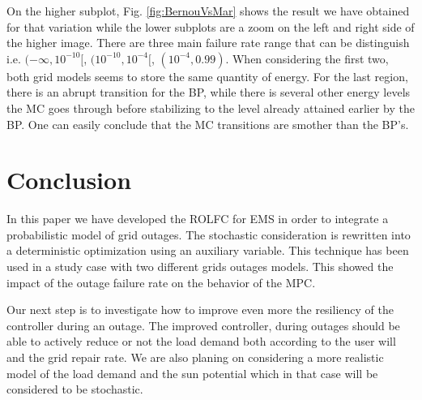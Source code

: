 \documentclass[conference]{IEEEtran}
\begin{document}
 On the higher subplot, Fig. \ref{fig:BernouVsMar} shows the result we have obtained for that variation while the lower subplots are a zoom on the left and right side of the higher image. There are three main failure rate range that can be distinguish i.e. $(-\infty,10^{-10}[$, $(10^{-10},10^{-4}[$, $(10^{-4},0.99)$. When considering the first two, both grid models seems to store the same quantity of energy. For the last region, there is an abrupt transition for the BP, while there is several other energy levels the MC goes through before stabilizing to the level already attained earlier by the BP. One can easily conclude that the MC transitions are smother than the BP's. 
 
 
\section{Conclusion}\label{conclusion}
In this paper we have developed the ROLFC for EMS in order to integrate a probabilistic model of grid outages. The stochastic consideration is rewritten into a deterministic optimization using an auxiliary variable. This technique has been used in a study case with two different grids outages models. This showed the impact of the outage  failure rate on the behavior of the MPC.

 Our next step is to investigate how to improve even more the resiliency of the controller during an outage. The improved controller, during outages should be able to actively reduce or not the load demand both according to the user will and the grid repair rate. We are also planing on considering a more realistic model of the load demand and the sun potential which in that case will be considered to be stochastic.
 
\end{document}

